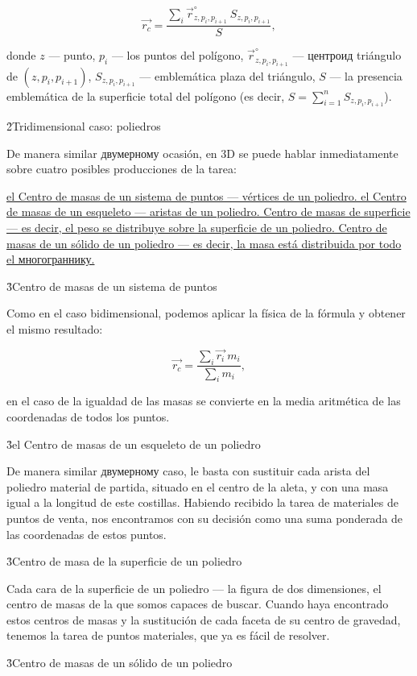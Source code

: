 $$ \vec{r_c} = \frac{ \sum\limits_i {\vec r}_{z,p_i,p_{i+1}}^\circ ~ S_{z,p_i,p_{i+1}} }{ S }, $$

donde $z$ --- punto, $p_i$ --- los puntos del polígono, ${\vec r}_{z,p_i,p_{i+1}}^\circ$ --- центроид triángulo de $(z,p_i,p_{i+1})$, $S_{z,p_i,p_{i+1}}$ --- emblemática plaza del triángulo, $S$ --- la presencia emblemática de la superficie total del polígono (es decir, $S = \sum_{i=1}^{n} S_{z,p_i,p_{i+1}}$).


\h2{Tridimensional caso: poliedros}

De manera similar двумерному ocasión, en 3D se puede hablar inmediatamente sobre cuatro posibles producciones de la tarea:

\ul{
\li el Centro de masas de un sistema de puntos --- vértices de un poliedro.
\li el Centro de masas de un esqueleto --- aristas de un poliedro.
\li Centro de masas de superficie --- es decir, el peso se distribuye sobre la superficie de un poliedro.
\li Centro de masas de un sólido de un poliedro --- es decir, la masa está distribuida por todo el многограннику.
}


\h3{Centro de masas de un sistema de puntos}

Como en el caso bidimensional, podemos aplicar la física de la fórmula y obtener el mismo resultado:

$$ \vec{r_c} = \frac{ \sum\limits_i \vec{r_i} ~ m_i }{ \sum\limits_i m_i }, $$

en el caso de la igualdad de las masas se convierte en la media aritmética de las coordenadas de todos los puntos.


\h3{el Centro de masas de un esqueleto de un poliedro}

De manera similar двумерному caso, le basta con sustituir cada arista del poliedro material de partida, situado en el centro de la aleta, y con una masa igual a la longitud de este costillas. Habiendo recibido la tarea de materiales de puntos de venta, nos encontramos con su decisión como una suma ponderada de las coordenadas de estos puntos.


\h3{Centro de masa de la superficie de un poliedro}

Cada cara de la superficie de un poliedro --- la figura de dos dimensiones, el centro de masas de la que somos capaces de buscar. Cuando haya encontrado estos centros de masas y la sustitución de cada faceta de su centro de gravedad, tenemos la tarea de puntos materiales, que ya es fácil de resolver.


\h3{Centro de masas de un sólido de un poliedro}

